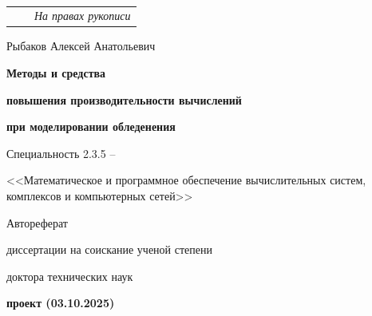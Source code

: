 \documentclass[a4paper,14pt]{extarticle}                     %
\theoremstyle{plain}                                         %
\begin{document}

\thispagestyle{empty}

\

\vspace{0pt plus0.5fill} %

\noindent%
\begin{tabularx}{\textwidth}{@{}lXr@{}}%
    & & \textit{На правах рукописи}\\
\end{tabularx}

\vspace{0pt plus5fill} %
\begin{center}
Рыбаков Алексей Анатольевич
\end{center}

\vspace{0pt plus2fill} %
\begin{center}
\textbf{\large Методы и средства}

\textbf{\large повышения производительности вычислений}

\textbf{\large при моделировании обледенения}

\vspace{0pt plus2fill} %
{Специальность 2.3.5 --\par <<Математическое и программное обеспечение вычислительных систем, комплексов и компьютерных сетей>>}

\vspace{0pt plus1.5fill} %
Автореферат\par
диссертации на соискание ученой степени\par доктора технических наук\par
\textbf{проект (03.10.2025)}
\end{center}
\end{document}
